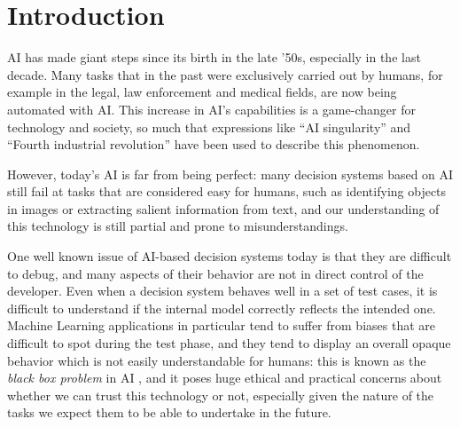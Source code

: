 \documentclass[conference]{IEEEtran}
\newcommand{\cit}[1][]{\todo[tickmarkheight=0.2cm]{cit #1}}
\begin{document}


\section{Introduction}
\label{sec:intro}

AI has made giant steps since its birth in the late '50s, especially in the last
decade. Many tasks that in the past were exclusively carried out by humans, for
example in the legal, law enforcement and medical fields, are now being
automated with AI. This increase in AI's capabilities is a game-changer for
technology and society, so much that expressions like ``AI singularity'' \cit
and ``Fourth industrial revolution'' \cit have been used to describe this
phenomenon.

However, today's AI is far from being perfect: many decision systems based on AI
still fail at tasks that are considered easy for humans, such as identifying
objects in images or extracting salient information from text, and our
understanding of this technology is still partial and prone to
misunderstandings.

One well known issue of AI-based decision systems today is that they are
difficult to debug, and many aspects of their behavior are not in direct control
of the developer. Even when a decision system behaves well in a set of test
cases, it is difficult to understand if the internal model correctly reflects
the intended one. Machine Learning applications in particular tend to suffer
from biases that are difficult to spot during the test phase, and they tend to
display an overall opaque behavior which is not easily understandable for
humans: this is known as the \textit{black box problem} in AI \cit, and it poses
huge ethical and practical concerns about whether we can trust this technology
or not, especially given the nature of the tasks we expect them to be able to
undertake in the future.
\end{document}
